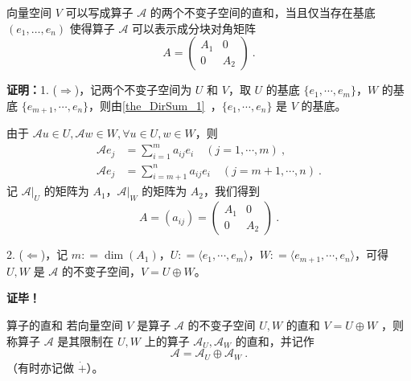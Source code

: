 \begin{theorem}{}\label{the_InvSP_1}
向量空间 $V$ 可以写成算子 $\mathcal{A}$ 的两个不变子空间的直和，当且仅当存在基底 $(e_1, \dots, e_n)$ 使得算子 $\mathcal{A}$ 可以表示成分块对角矩阵
\begin{equation}
A=\begin{pmatrix}
A_1 & 0\\
0 & A_2
\end{pmatrix}~.
\end{equation}

\end{theorem}

\textbf{证明：}1. ($\Rightarrow$)，记两个不变子空间为 $U$ 和 $V$，取 $U$ 的基底 $\{e_1 ,\cdots, e_m\}$，$W$ 的基底 $\{e_{m+1}, \cdots, e_n\}$，则由\autoref{the_DirSum_1}~，$\{e_{1}, \cdots, e_n\}$ 是 $V$ 的基底。

由于 $\mathcal{A}u\in U, \mathcal{A} w\in W,\forall  u\in U, w\in W$，则
\begin{equation}\label{eq_InvSP_2}
\begin{aligned}
\mathcal{A} e_j&=\sum_{i=1}^m a_{ij} e_i\quad (j=1,\cdots ,m)~,\\
\mathcal{A} e_j&=\sum_{i=m+1}^n a_{ij} e_i\quad (j=m+1,\cdots ,n)~.
\end{aligned}
\end{equation}
记 $\mathcal{A}|_U$ 的矩阵为 $A_1$，$\mathcal{A}|_W$ 的矩阵为 $A_2$，我们得到
\begin{equation}
A=(a_{ij})=\begin{pmatrix}
A_1 & 0\\
0 & A_2
\end{pmatrix}~.
\end{equation}

2. ($\Leftarrow$)，记 $m: = \dim(A_1)$，$U: = \langle e_1, \cdots, e_m\rangle$，$W: = \langle e_{m + 1}, \cdots, e_n\rangle$，可得 $U, W$ 是 $\mathcal{A}$ 的不变子空间，$V = U \oplus W$。

\textbf{证毕！}

\begin{definition}{算子的直和}
若向量空间 $V$ 是算子 $\mathcal{A}$ 的不变子空间 $U,W$ 的直和 $V=U\oplus W$ ，则称算子 $\mathcal{A}$ 是其限制在 $U,W$ 上的算子 $\mathcal{A}_U,\mathcal{A}_W$ 的直和，并记作
\begin{equation}
\mathcal{A}=\mathcal{A}_U \oplus \mathcal{A}_W~.
\end{equation}
（有时亦记做 $\dot{+}$）。

\end{definition}
